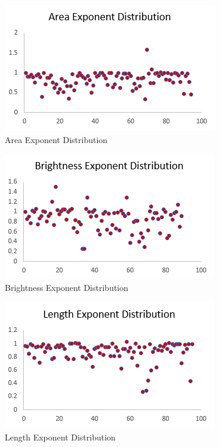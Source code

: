 \documentclass{article}
\begin{document}
\begin{multicols}{2}
\begin{figure}[H]
    \centering
    \includegraphics[width=\columnwidth]{AreaGraph}
    \caption{Area Exponent Distribution}
    \label{fig:AreaGraph}
\end{figure}

\begin{figure}[H]
    \centering
    \includegraphics[width=\columnwidth]{BrightnessGraph}
    \caption{Brightness Exponent Distribution}
    \label{fig:BrightnessGraph}
\end{figure}

\begin{figure}[H]
    \centering
    \includegraphics[width=\columnwidth]{LengthGraph}
    \caption{Length Exponent Distribution}
    \label{fig:LengthGraph}
\end{figure}


\end{multicols}
\end{document}
